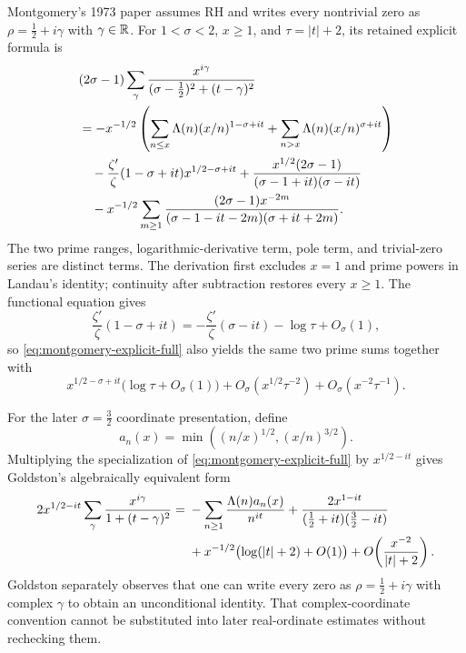 Montgomery's 1973 paper assumes RH and writes every nontrivial zero as
$\rho=\tfrac12+i\gamma$ with $\gamma\in\mathbb R$.  For $1<\sigma<2$, $x\geq1$, and
$\tau=|t|+2$, its retained explicit formula is
\cite[pp.~185--187, eqs.~(18)--(22)]{montgomery1973}
\begin{align}
 &(2\sigma-1)\sum_\gamma
 \frac{x^{i\gamma}}{(\sigma-\tfrac12)^2+(t-\gamma)^2} \notag\\
 &=-x^{-1/2}\left(
   \sum_{n\leq x}\Lambda(n)(x/n)^{1-\sigma+it}
   +\sum_{n>x}\Lambda(n)(x/n)^{\sigma+it}\right) \notag\\
 &\quad-\frac{\zeta'}{\zeta}(1-\sigma+it)x^{1/2-\sigma+it}
 +\frac{x^{1/2}(2\sigma-1)}{(\sigma-1+it)(\sigma-it)} \notag\\
 &\quad-x^{-1/2}\sum_{m\geq1}
 \frac{(2\sigma-1)x^{-2m}}
 { (\sigma-1-it-2m)(\sigma+it+2m)}.
 \label{eq:montgomery-explicit-full}
\end{align}
The two prime ranges, logarithmic-derivative term, pole term, and trivial-zero series are
distinct terms.  The derivation first excludes $x=1$ and prime powers in Landau's identity;
continuity after subtraction restores every $x\geq1$.  The functional equation gives
\[
 \frac{\zeta'}{\zeta}(1-\sigma+it)
 =-\frac{\zeta'}{\zeta}(\sigma-it)-\log\tau+O_\sigma(1),
\]
so \eqref{eq:montgomery-explicit-full} also yields the same two prime sums together with
\[
 x^{1/2-\sigma+it}\bigl(\log\tau+O_\sigma(1)\bigr)
 +O_\sigma(x^{1/2}\tau^{-2})+O_\sigma(x^{-2}\tau^{-1}).
\]

For the later $\sigma=\tfrac32$ coordinate presentation, define
\begin{equation}
 a_n(x)=\min\!\left((n/x)^{1/2},(x/n)^{3/2}\right).
 \label{eq:montgomery-an}
\end{equation}
Multiplying the specialization of \eqref{eq:montgomery-explicit-full} by
$x^{1/2-it}$ gives Goldston's algebraically equivalent form
\cite[eqs.~(3.11)--(3.14)]{goldston2004}
\begin{align}
 2x^{1/2-it}\sum_\gamma\frac{x^{i\gamma}}{1+(t-\gamma)^2}
 ={}&-\sum_{n\geq1}\frac{\Lambda(n)a_n(x)}{n^{it}}
 +\frac{2x^{1-it}}{(\tfrac12+it)(\tfrac32-it)} \notag\\
 &+x^{-1/2}\bigl(\log(|t|+2)+O(1)\bigr)
 +O\!\left(\frac{x^{-2}}{|t|+2}\right).
 \label{eq:montgomery-explicit}
\end{align}
Goldston separately observes that one can write every zero as
$\rho=\tfrac12+i\gamma$ with complex $\gamma$ to obtain an unconditional identity.  That
complex-coordinate convention cannot be substituted into later real-ordinate estimates
without rechecking them.

